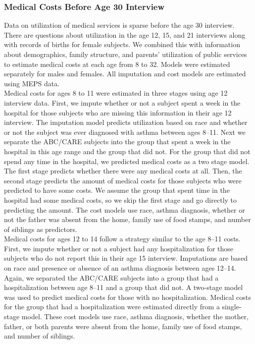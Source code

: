 \subsubsection{Medical Costs Before Age 30 Interview}

\noindent Data on utilization of medical services is sparse before the age 30 interview. There are questions about utilization in the age 12, 15, and 21 interviews along with records of births for female subjects. We combined this with information about demographics, family structure, and parents' utilization of public services to estimate medical costs at each age from 8 to 32. Models were estimated separately for males and females. All imputation and cost models are estimated using MEPS data. \\

\noindent Medical costs for ages 8 to 11 were estimated in three stages using age 12 interview data. First, we impute whether or not a subject spent a week in the hospital for those subjects who are missing this information in their age 12 interview. The imputation model predicts utilization based on race and whether or not the subject was ever diagnosed with asthma between ages 8--11. Next we separate the ABC/CARE subjects into the group that spent a week in the hospital in this age range and the group that did not. For the group that did not spend any time in the hospital, we predicted medical costs as a two stage model. The first stage predicts whether there were any medical costs at all. Then, the second stage predicts the amount of medical costs for those subjects who were predicted to have some costs. We assume the group that spent time in the hospital had some medical costs, so we skip the first stage and go directly to predicting the amount. The cost models use race, asthma diagnosis, whether or not the father was absent from the home, family use of food stamps, and number of siblings as predictors.\\

\noindent Medical costs for ages 12 to 14 follow a strategy similar to the age 8--11 costs. First, we impute whether or not a subject had any hospitalization for those subjects who do not report this in their age 15 interview. Imputations are based on race and presence or absence of an asthma diagnosis between ages 12--14. Again, we separated the ABC/CARE subjects into a group that had a hospitalization between age 8--11 and a group that did not. A two-stage model was used to predict medical costs for those with no hospitalization. Medical costs for the group that had a hospitalization were estimated directly from a single-stage model. These cost models use race, asthma diagnosis, whether the mother, father, or both parents were absent from the home, family use of food stamps, and number of siblings.\\

